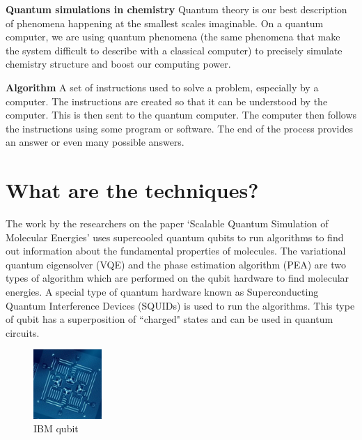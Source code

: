 \documentclass[14pt,landscape,color=UCLdarkred,margin=3cm]{uclposter}
\begin{document}
\begin{multicols}{3}
\begin{highlightbox}
\textbf{Quantum simulations in chemistry} Quantum theory is our best description of phenomena happening at the smallest scales imaginable. On a quantum computer, we are using quantum phenomena (the same phenomena that make the system difficult to describe with a classical computer) to precisely simulate chemistry structure and boost our computing power.
\end{highlightbox}

\begin{highlightbox}
\textbf{Algorithm} A set of instructions used to solve a problem, especially by a computer. The instructions are created so that it can be understood by the computer. This is then sent to the quantum computer. The computer then follows the instructions using some program or software. The end of the process provides an answer or even many possible answers.
\end{highlightbox}

\columnbreak

\section*{What are the techniques?}
The work by the researchers on the paper `Scalable Quantum Simulation of Molecular Energies' uses supercooled quantum qubits to run algorithms to find out information about the fundamental properties of molecules.
The variational quantum eigensolver (VQE) and the phase estimation algorithm (PEA) are two types of algorithm which are performed on the qubit hardware to find molecular energies. A special type of quantum hardware known as Superconducting Quantum Interference Devices (SQUIDs) is used to run the algorithms. This type of qubit has a superposition of ``charged" states and can be used in quantum circuits.
\\
\begin{figure}[H]
  \begin{center}
\setlength{\fboxsep}{0.5em}
  \begin{minipage}[c]{9em}
  \begin{center}
  \includegraphics[width=7em]{4_Qubit.png}
    \caption{IBM qubit}
  \end{center}
    

\end{minipage}
\end{center}
\end{figure}
\end{multicols}
\end{document}
